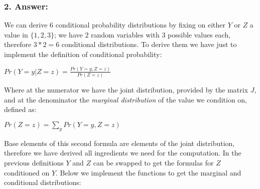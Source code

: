 \documentclass[
]{article}
\begin{document}
\hypertarget{answer-1}{%
\subsubsection{2. Answer:}\label{answer-1}}

We can derive \(6\) conditional probability distributions by fixing on
either \(Y\) or \(Z\) a value in \(\{1,2,3\}\); we have \(2\) random
variables with \(3\) possible values each, therefore \(3*2=6\)
conditional distributions. To derive them we have just to implement the
definition of conditional probability:

\(Pr(Y = y | Z = z) = \frac{Pr(Y = y, Z = z)}{Pr(Z = z)}\)

Where at the numerator we have the joint distribution, provided by the
matrix \(J\), and at the denominator the \emph{marginal distribution} of
the value we condition on, defined as:

\(Pr(Z = z) = \sum_yPr(Y = y, Z = z)\)

Base elements of this second formula are elements of the joint
distribution, therefore we have derived all ingredients we need for the
computation. In the previous definitions \(Y\) and \(Z\) can be swapped
to get the formulas for \(Z\) conditioned on \(Y\). Below we implement
the functions to get the marginal and conditional distributions:
\end{document}
